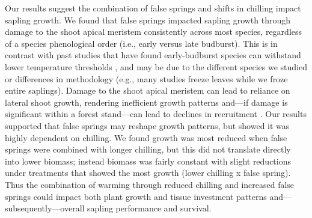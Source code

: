 \documentclass{article}\usepackage[]{graphicx}\usepackage[]{color}
\begin{document}
Our results suggest the combination of false springs and shifts in chilling impact sapling growth. We found that false springs impacted sapling growth through damage to the shoot apical meristem consistently across most species, regardless of a species phenological order (i.e., early versus late budburst). This is in contrast with past studies that have found early-budburst species can withstand lower temperature thresholds \citep{Lenz2013, Muffler2016}, and may be due to the different species we studied or differences in methodology (e.g., many studies freeze leaves while we froze entire saplings). Damage to the shoot apical meristem can lead to reliance on lateral shoot growth, rendering inefficient growth patterns and---if damage is significant within a forest stand---can lead to declines in recruitment \citep{Rhodes2018}. Our results supported that false springs may reshape growth patterns, but showed it was highly dependent on chilling. We found growth was most reduced when false springs were combined with longer chilling, but this did not translate directly into lower biomass; instead biomass was fairly constant with slight reductions under treatments that showed the most growth (lower chilling x false spring). Thus the combination of warming through reduced chilling and increased false springs could impact both plant growth and tissue investment patterns and---subsequently---overall sapling performance and survival. 
  
\end{document}
